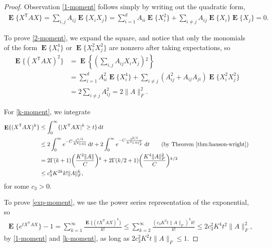 \documentclass[letterpaper]{amsart}
\DeclareMathOperator{\E}{\mathbf{E}}
\let\Pr\relax
\DeclareMathOperator{\Pr}{\mathbf{P}}
\let\originalleft\left
\let\originalright\right
\def\left#1{\mathopen{}\originalleft#1}
\def\right#1{\originalright#1\mathclose{}}
\newcommand{\dif}{\mathop{}\!\mathrm{d}}
\newcommand{\thmref}[1]{Theorem~\ref{thm:#1}}
\numberwithin{thm}{section}
\theoremstyle{definition}
\theoremstyle{plain}
\newcommand{\transpose}{^{\mathsf{T}}}
\begin{document}
\begin{proof}
  Observation \ref{1-moment} follows simply by writing out the quadratic form,
  \begin{align*}
    \E\{X\transpose A X\} = \sum_{i , j} A_{ij} \E\{X_i X_j\} = \sum_{i = 1}^d A_{ii} \E\{X_i^2\} + \sum_{i \neq j} A_{ij} \E\{X_i\} \E\{X_j\} = 0 .
  \end{align*}

  To prove \ref{2-moment}, we expand the square, and notice that only
  the monomials of the form $\E \{X_i^4\}$ or $\E\{X_i^2 X_j^2\}$ are
  nonzero after taking expectations, so
  \begin{align*}
    \E\{(X\transpose A X)^2\} & = \E\left\{ \left( \sum_{i, j} A_{ij} X_i X_j \right)^2 \right\}  \\
                              & = \sum_{i = 1}^d A_{ii}^2 \E \{X_i^4\}
                                + \sum_{i\neq j} \left(A_{ij}^2 + A_{ij} A_{ji}\right) \E \{X_i^2 X_j^2\} \\
                              &= 2 \sum_{i \neq j} A_{i j}^2 = 2 \|A\|_F^2.
  \end{align*}

  For \ref{k-moment}, we integrate
  \begin{align*}
    \E\{(X\transpose A X)^k\} &\le \int_0^\infty \Pr\{|X\transpose A X|^k \ge t\} \dif t \\
                      &\le 2 \int_0^\infty e^{-C \frac{t^{1/k}}{K^2 \|A\|}} \dif t + 2\int_0^\infty e^{-C \frac{t^{2/k}}{K^4 \|A\|_F^2}} \dif t \tag{by \thmref{hanson-wright}} \\
                      &= 2 \Gamma(k + 1) \left( \frac{K^2 \|A\|}{C} \right)^k + 2 \Gamma(k/2 + 1) \left( \frac{K^4 \|A\|_F^2}{C} \right)^{k/2}  \\
                      &\le c_3^k K^{2k} k! \|A\|_F^k ,
  \end{align*}
   for some $c_3 > 0$. 
  
   To prove \ref{exp-moment}, we use the power series representation
   of the exponential, so
  \begin{align*}
   \E\{e^{t X\transpose A X}\} -1 = \sum_{k = 1}^\infty \frac{\E\{(t X\transpose A X)^k\}}{k!} 
                       \le  \sum_{k = 2}^\infty \frac{(c_3 K^2 t \|A\|_F)^k k!}{k!} 
                       \le 2 c_3^2 K^4 t^2 \|A\|_F^2 ,
  \end{align*}
  by \ref{1-moment} and \ref{k-moment}, as long as $ 2c_3^2 K^2 t \|A\|_F \leq 1 $.
\end{proof}
\end{document}
